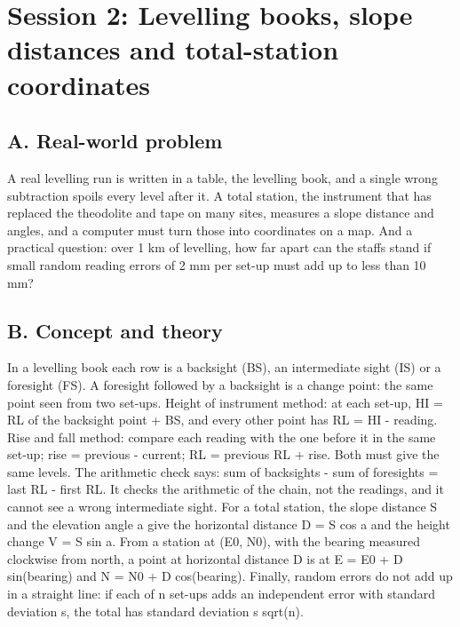 \documentclass[11pt,a4paper]{article}
\begin{document}
\section{Session 2: Levelling books, slope distances and total-station coordinates}

\subsection*{A. Real-world problem}
A real levelling run is written in a table, the levelling book, and a single wrong subtraction spoils every level after it. A total station, the instrument that has replaced the theodolite and tape on many sites, measures a slope distance and angles, and a computer must turn those into coordinates on a map. And a practical question: over 1 km of levelling, how far apart can the staffs stand if small random reading errors of 2 mm per set-up must add up to less than 10 mm?

\subsection*{B. Concept and theory}
In a levelling book each row is a backsight (BS), an intermediate sight (IS) or a foresight (FS). A foresight followed by a backsight is a change point: the same point seen from two set-ups. Height of instrument method: at each set-up, HI = RL of the backsight point + BS, and every other point has RL = HI - reading. Rise and fall method: compare each reading with the one before it in the same set-up; rise = previous - current; RL = previous RL + rise. Both must give the same levels. The arithmetic check says: sum of backsights - sum of foresights = last RL - first RL. It checks the arithmetic of the chain, not the readings, and it cannot see a wrong intermediate sight. For a total station, the slope distance S and the elevation angle a give the horizontal distance D = S cos a and the height change V = S sin a. From a station at (E0, N0), with the bearing measured clockwise from north, a point at horizontal distance D is at E = E0 + D sin(bearing) and N = N0 + D cos(bearing). Finally, random errors do not add up in a straight line: if each of n set-ups adds an independent error with standard deviation s, the total has standard deviation s sqrt(n).
\end{document}
